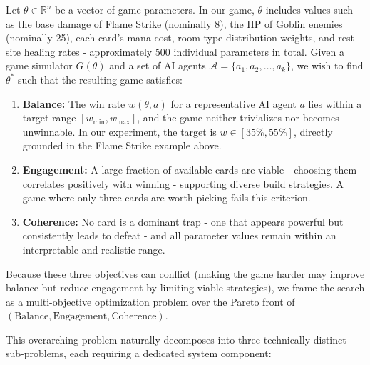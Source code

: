 Let $\theta \in \mathbb{R}^n$ be a vector of game parameters. In our game, $\theta$ includes values such as the base damage of Flame Strike (nominally 8), the HP of Goblin enemies (nominally 25), each card's mana cost, room type distribution weights, and rest site healing rates - approximately 500 individual parameters in total. Given a game simulator $G(\theta)$ and a set of AI agents $\mathcal{A} = \{a_1, a_2, \ldots, a_k\}$, we wish to find $\theta^*$ such that the resulting game satisfies:
\begin{enumerate}
    \item \textbf{Balance:} The win rate $w(\theta, a)$ for a representative AI agent $a$ lies within a target range $[w_{\min}, w_{\max}]$, and the game neither trivializes nor becomes unwinnable. In our experiment, the target is $w \in [35\%, 55\%]$, directly grounded in the Flame Strike example above.
    \item \textbf{Engagement:} A large fraction of available cards are viable - choosing them correlates positively with winning - supporting diverse build strategies. A game where only three cards are worth picking fails this criterion.
    \item \textbf{Coherence:} No card is a dominant trap - one that appears powerful but consistently leads to defeat - and all parameter values remain within an interpretable and realistic range.
\end{enumerate}
Because these three objectives can conflict (making the game harder may improve balance but reduce engagement by limiting viable strategies), we frame the search as a multi-objective optimization problem over the Pareto front of $(\text{Balance}, \text{Engagement}, \text{Coherence})$.

This overarching problem naturally decomposes into three technically distinct sub-prob\-lems, each requiring a dedicated system component:

